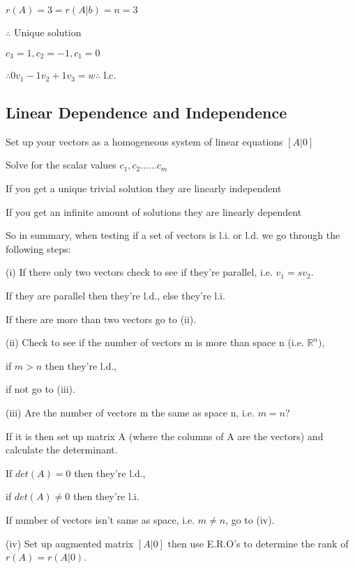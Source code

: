 \documentclass{extarticle}
\begin{document}
\begin{multicols}{4}
$r(A)=3=r(A|b)=n=3$

$\therefore$ Unique solution

$c_3=1,c_2=-1,c_1=0$

$\therefore 0v_1-1v_2+1v_3=w \therefore$ l.c.







\subsection{Linear Dependence and Independence}
Set up your vectors as a homogeneous system of linear equations $[A|0]$

Solve for the scalar values $c_1, c_2...... c_m$

If you get a unique trivial solution they are linearly independent

If you get an infinite amount of solutions they are linearly dependent

\begin{tcolorbox}[enhanced jigsaw,sharp corners,coltext=black,colback=Green!25!white,boxrule=0pt,breakable,size=minimal]
So in summary, when testing if a set of vectors is l.i. or l.d. we go through the following steps:

(i) If there only two vectors check to see if they're parallel, i.e. $v_1 = sv_2$.

If they are parallel then they're l.d., else they're l.i.

If there are more than two vectors go to (ii).

(ii) Check to see if the number of vectors m is more than space n (i.e. ${\mathbb{R}}^n)$, 

if $m > n$ then they're l.d.,

if not go to (iii).

(iii) Are the number of vectors m the same as space n, i.e. $m = n$?

If it is then set up matrix A (where the columns of A are the vectors) and calculate the determinant.

If $det (A) = 0$ then they're l.d.,

if $det (A) \ne 0$ then they're l.i.

If number of vectors isn't same as space, i.e. $m \ne n$, go to (iv).

(iv) Set up augmented matrix $[A|0]$ then use E.R.O's to determine the rank of $r(A) =
r(A|0)$.


\end{tcolorbox}
\end{multicols}
\end{document}
